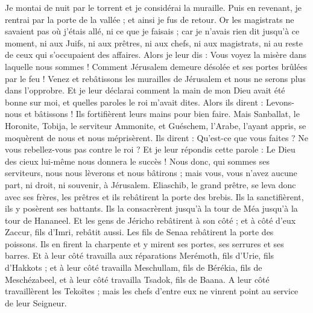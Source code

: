 \begin{multicols}{2}
Je montai de nuit par le torrent et je considérai la muraille. Puis en revenant, je rentrai par la porte de la vallée ; et ainsi je fus de retour.
Or les magistrats ne savaient pas où j'étais allé, ni ce que je faisais ; car je n'avais rien dit jusqu'à ce moment, ni aux Juifs, ni aux prêtres, ni aux chefs, ni aux magistrats, ni au reste de ceux qui s'occupaient des affaires.
Alors je leur dis : Vous voyez la misère dans laquelle nous sommes ! Comment Jérusalem demeure désolée et ses portes brûlées par le feu ! Venez et rebâtissons les murailles de Jérusalem et nous ne serons plus dans l'opprobre.
Et je leur déclarai comment la main de mon Dieu avait été bonne sur moi, et quelles paroles le roi m'avait dites. Alors ils dirent : Levons-nous et bâtissons ! Ils fortifièrent leurs mains pour bien faire.
Mais Sanballat, le Horonite, Tobija, le serviteur Ammonite, et Guéschem, l'Arabe, l'ayant appris, se moquèrent de nous et nous méprisèrent. Ils dirent : Qu'est-ce que vous faites ? Ne vous rebellez-vous pas contre le roi ?
Et je leur répondis cette parole : Le Dieu des cieux lui-même nous donnera le succès ! Nous donc, qui sommes ses serviteurs, nous nous lèverons et nous bâtirons ; mais vous, vous n'avez aucune part, ni droit, ni souvenir, à Jérusalem.
\VerseOne{}Eliaschib, le grand prêtre, se leva donc avec ses frères, les prêtres et ils rebâtirent la porte des brebis. Ils la sanctifièrent, ils y posèrent ses battants. Ils la consacrèrent jusqu'à la tour de Méa jusqu'à la tour de Hananeel.
Et les gens de Jéricho rebâtirent à son côté ; et à côté d'eux Zaccur, fils d'Imri, rebâtit aussi.
Les fils de Senaa rebâtirent la porte des poissons. Ils en firent la charpente et y mirent ses portes, ses serrures et ses barres.
Et à leur côté travailla aux réparations Merémoth, fils d'Urie, fils d'Hakkots ; et à leur côté travailla Meschullam, fils de Bérékia, fils de Meschézabeel, et à leur côté travailla Tsadok, fils de Baana.
A leur côté travaillèrent les Tekoïtes ; mais les chefs d'entre eux ne vinrent point au service de leur Seigneur.

\end{multicols}
